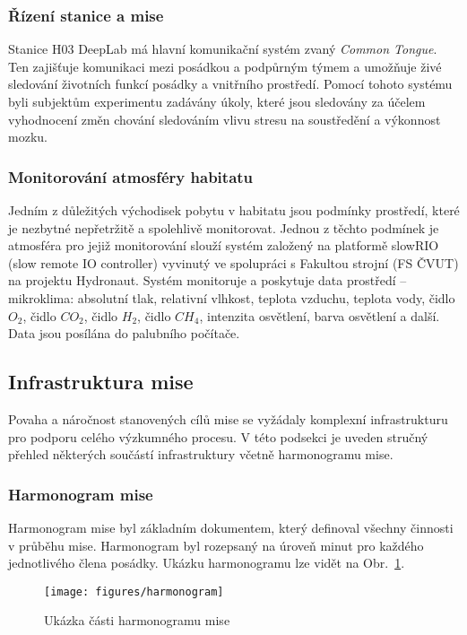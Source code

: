 \subsubsection{Řízení stanice a mise}
\label{subsubsec:rizeni_stanice_mise}
Stanice H03 DeepLab má hlavní komunikační systém zvaný \textit{Common Tongue}.
Ten zajišťuje komunikaci mezi posádkou a podpůrným týmem a umožňuje živé
sledování životních funkcí posádky a vnitřního prostředí. Pomocí tohoto systému
byli subjektům experimentu zadávány úkoly, které jsou sledovány za účelem
vyhodnocení změn chování sledováním vlivu stresu na soustředění a výkonnost
mozku.

\subsubsection{Monitorování atmosféry habitatu}
Jedním z důležitých východisek pobytu v habitatu jsou podmínky prostředí, které
je nezbytné nepřetržitě a spolehlivě monitorovat. Jednou z těchto podmínek je
atmosféra pro jejiž monitorování slouží systém založený na platformě slowRIO
(slow remote IO controller) vyvinutý ve spolupráci s Fakultou strojní (FS ČVUT)
na projektu Hydronaut. Systém monitoruje a poskytuje data prostředí --
mikroklima: absolutní tlak, relativní vlhkost, teplota vzduchu, teplota vody,
čidlo $O_2$, čidlo $CO_2$, čidlo $H_2$, čidlo $CH_4$, intenzita osvětlení, barva
osvětlení a další. Data jsou posílána do palubního počítače.

\subsection{Infrastruktura mise}
\label{subsec:infrastruktura_mise}
Povaha a náročnost stanovených cílů mise se vyžádaly komplexní infrastrukturu
pro podporu celého výzkumného procesu. V této podsekci je uveden stručný přehled
některých součástí infrastruktury včetně harmonogramu mise.

\subsubsection{Harmonogram mise}
\label{subsubsec:harmonogram_mise}
Harmonogram mise byl základním dokumentem, který definoval všechny činnosti v
průběhu mise. Harmonogram byl rozepsaný na úroveň minut pro každého jednotlivého
člena posádky. Ukázku harmonogramu lze vidět na Obr.~\ref{fig:harmonogram}.

\begin{figure}[h]
    \begin{center}
        \begin{framed}
            \texttt{[image: figures/harmonogram]}
        \end{framed}
        \caption{Ukázka části harmonogramu mise}
        \label{fig:harmonogram}
    \end{center}
\end{figure}

